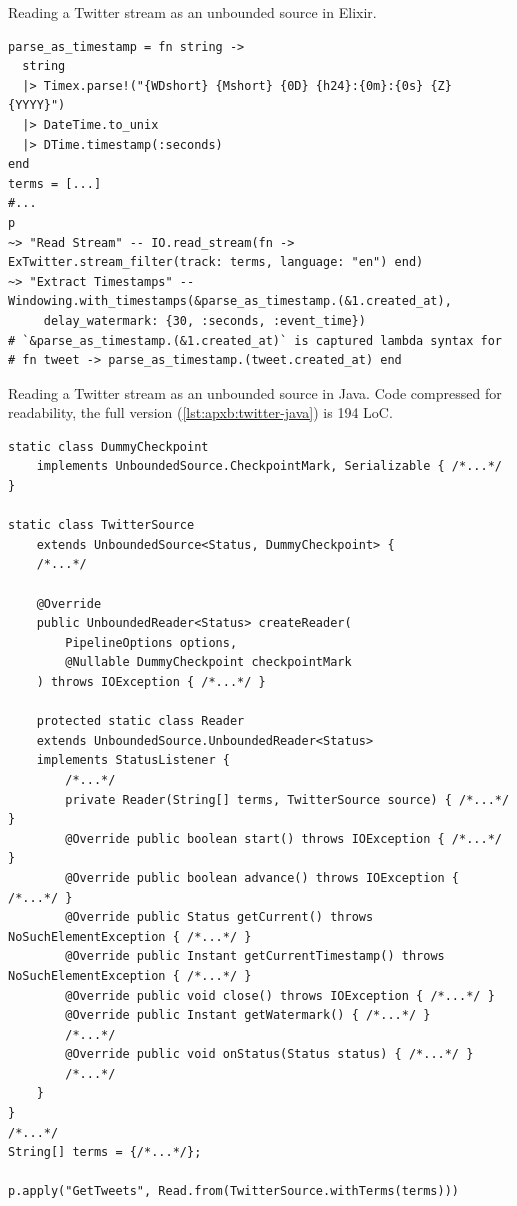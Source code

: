 \begin{codelisting}
	\caption{Reading a Twitter stream as an unbounded source in Elixir.}
	\label{lst:eval:twitter-readstream-elixir}
	\begin{verbatim}
parse_as_timestamp = fn string ->
  string
  |> Timex.parse!("{WDshort} {Mshort} {0D} {h24}:{0m}:{0s} {Z} {YYYY}")
  |> DateTime.to_unix
  |> DTime.timestamp(:seconds)
end
terms = [...]
#...
p
~> "Read Stream" -- IO.read_stream(fn -> ExTwitter.stream_filter(track: terms, language: "en") end)
~> "Extract Timestamps" -- Windowing.with_timestamps(&parse_as_timestamp.(&1.created_at),
     delay_watermark: {30, :seconds, :event_time})
# `&parse_as_timestamp.(&1.created_at)` is captured lambda syntax for
# fn tweet -> parse_as_timestamp.(tweet.created_at) end
	\end{verbatim}
\end{codelisting}

\begin{codelisting}
	\caption[Reading a Twitter stream as an unbounded source in Java.]{Reading a Twitter stream as an unbounded source in Java. Code compressed for readability, the full version (\cref{lst:apxb:twitter-java}) is 194 LoC.}
	\label{lst:eval:twitter-readstream-java}
	\begin{verbatim}
static class DummyCheckpoint
    implements UnboundedSource.CheckpointMark, Serializable { /*...*/ }
    
static class TwitterSource
    extends UnboundedSource<Status, DummyCheckpoint> {
    /*...*/
        
    @Override
    public UnboundedReader<Status> createReader(
        PipelineOptions options,
        @Nullable DummyCheckpoint checkpointMark
    ) throws IOException { /*...*/ }

    protected static class Reader
    extends UnboundedSource.UnboundedReader<Status>
    implements StatusListener {
        /*...*/
        private Reader(String[] terms, TwitterSource source) { /*...*/ }
        @Override public boolean start() throws IOException { /*...*/ }
        @Override public boolean advance() throws IOException { /*...*/ }
        @Override public Status getCurrent() throws NoSuchElementException { /*...*/ }
        @Override public Instant getCurrentTimestamp() throws NoSuchElementException { /*...*/ }
        @Override public void close() throws IOException { /*...*/ }
        @Override public Instant getWatermark() { /*...*/ }
        /*...*/
        @Override public void onStatus(Status status) { /*...*/ }
        /*...*/
    }
}
/*...*/
String[] terms = {/*...*/};

p.apply("GetTweets", Read.from(TwitterSource.withTerms(terms)))
	\end{verbatim}
\end{codelisting}

